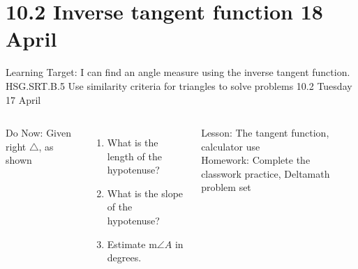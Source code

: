 \documentclass[onlytextwidth, aspectratio=169]{beamer}
\begin{document}
\section{10.2 Inverse tangent function \hfill 18 April \,}
\begin{frame}{Learning Target: I can find an angle measure using the inverse tangent function.}
  {HSG.SRT.B.5 Use similarity criteria for triangles to solve problems \hfill \alert{10.2 Tuesday 17 April}}
  \begin{columns}
    Do Now: Given right $\triangle$, as shown
    \begin{enumerate}
      \item What is the length of the hypotenuse?
      \item What is the slope of the hypotenuse?
      \item Estimate m$\angle A$ in degrees.
    \end{enumerate} \vspace{0.5cm}
    Lesson: The tangent function, calculator use \\[0.5cm]
    Homework: Complete the classwork practice, Deltamath problem set
    \begin{flushright}
    \end{flushright}
  \end{columns}
\end{frame}
\end{document}
